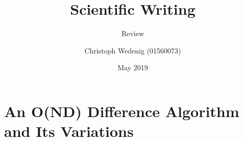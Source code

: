 \documentclass{scrartcl}
\title{Scientific Writing}
\subtitle{Review}
\author{Christoph Wedenig (01560073)}
\date{May 2019}
\begin{document}
\maketitle

\section{An O(ND) Difference Algorithm and Its Variations}




\end{document}
